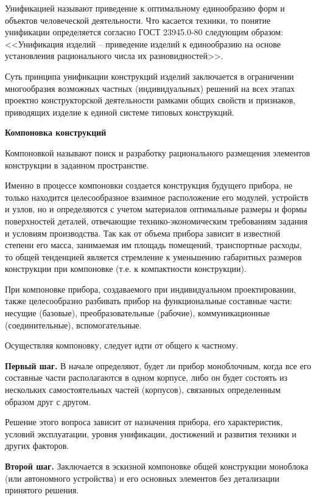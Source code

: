 Унификацией называют приведение к оптимальному единообразию форм и объектов человеческой деятельности.
Что касается техники, то понятие унификации определяется согласно ГОСТ 23945.0-80 следующим образом: <<Унификация изделий -- приведение изделий к единообразию на основе установления рационального числа их разновидностей>>.

Суть принципа унификации конструкций изделий заключается в ограничении многообразия возможных частных (индивидуальных) решений на всех этапах проектно конструкторской деятельности рамками общих свойств и признаков, приводящих изделие к единой системе типовых конструкций.

\begin{flushleft}
\textbf{Компоновка конструкций}
\end{flushleft}

Компоновкой называют поиск и разработку рационального размещения элементов конструкции в заданном пространстве.

Именно в процессе компоновки создается конструкция будущего прибора, не только находится целесообразное взаимное расположение его модулей, устройств и узлов, но и определяются с учетом материалов оптимальные размеры и формы поверхностей деталей, отвечающие технико-экономическим требованиям задания и условиям производства. 
Так как от объема прибора зависит в известной степени его масса, занимаемая им площадь помещений, транспортные расходы, то общей тенденцией является стремление к уменьшению габаритных размеров конструкции при компоновке (т.е. к компактности конструкции).

При компоновке прибора, создаваемого при индивидуальном проектировании, также целесообразно разбивать прибор на функциональные составные части: несущие (базовые), преобразовательные (рабочие), коммуникационные (соединительные), вспомогательные.

Осуществляя компоновку, следует идти от общего к частному.

\textbf{Первый шаг.} В начале определяют, будет ли прибор моноблочным, когда все его составные части располагаются в одном корпусе, либо он будет состоять из нескольких самостоятельных частей (корпусов), связанных определенным образом друг с другом.

Решение этого вопроса зависит от назначения прибора, его характеристик, условий эксплуатации, уровня унификации, достижений и развития техники и других факторов.

\textbf{Второй шаг.} Заключается в эскизной компоновке общей конструкции моноблока (или автономного устройства) и его основных элементов без детализации принятого решения.

